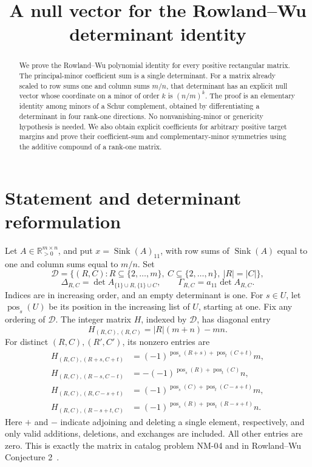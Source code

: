 \documentclass[11pt]{article}
\title{A null vector for the Rowland--Wu determinant identity}
\author{}\date{}
\newcommand{\pos}{\operatorname{pos}}
\newcommand{\Sink}{\operatorname{Sink}}
\newcommand{\D}{\mathcal D}
\begin{document}
\maketitle
\begin{abstract}
We prove the Rowland--Wu polynomial identity for every positive rectangular matrix. The principal-minor coefficient sum is a single determinant. For a matrix already scaled to row sums one and column sums $m/n$, that determinant has an explicit null vector whose coordinate on a minor of order $k$ is $(n/m)^k$. The proof is an elementary identity among minors of a Schur complement, obtained by differentiating a determinant in four rank-one directions. No nonvanishing-minor or genericity hypothesis is needed. We also obtain explicit coefficients for arbitrary positive target margins and prove their coefficient-sum and complementary-minor symmetries using the additive compound of a rank-one matrix.
\end{abstract}

\section{Statement and determinant reformulation}
Let $A\in\mathbb R_{>0}^{m\times n}$, and put $x=\Sink(A)_{11}$, with row sums of $\Sink(A)$ equal to one and column sums equal to $m/n$. Set
\[
 \D=\{(R,C):R\subseteq\{2,\ldots,m\},\ C\subseteq\{2,\ldots,n\},\ |R|=|C|\},
\]
\[
 \Delta_{R,C}=\det A_{\{1\}\cup R,\{1\}\cup C},\qquad
 \Gamma_{R,C}=a_{11}\det A_{R,C}.
\]
Indices are in increasing order, and an empty determinant is one. For $s\in U$, let $\pos_s(U)$ be its position in the increasing list of $U$, starting at one. Fix any ordering of $\D$. The integer matrix $H$, indexed by $\D$, has diagonal entry
\[
 H_{(R,C),(R,C)}=|R|(m+n)-mn.
\]
For distinct $(R,C),(R',C')$, its nonzero entries are
\begin{align*}
 H_{(R,C),(R+s,C+t)}&=(-1)^{\pos_s(R+s)+\pos_t(C+t)}m,\\
 H_{(R,C),(R-s,C-t)}&=-(-1)^{\pos_s(R)+\pos_t(C)}n,\\
 H_{(R,C),(R,C-s+t)}&=(-1)^{\pos_s(C)+\pos_t(C-s+t)}m,\\
 H_{(R,C),(R-s+t,C)}&=(-1)^{\pos_s(R)+\pos_t(R-s+t)}n.
\end{align*}
Here $+$ and $-$ indicate adjoining and deleting a single element, respectively, and only valid additions, deletions, and exchanges are included. All other entries are zero. This is exactly the matrix in catalog problem NM-04 and in Rowland--Wu Conjecture 2~\cite{rw,catalog}.
\end{document}
